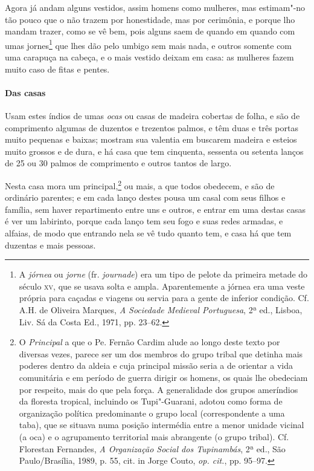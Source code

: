 \begin{linenumbers}
 Agora já andam alguns vestidos, assim homens como mulheres, mas
estimam"-no tão pouco que o não trazem por honestidade, mas por
cerimônia, e porque lho mandam trazer, como se vê bem, pois alguns
saem de quando em quando com umas jornes\footnote{ A \textit{jórnea} 
ou \textit{jorne} (fr. \textit{journade}) era um tipo
de pelote da primeira metade do século \textsc{xv}, que se usava solta e
ampla\textit{.} Aparentemente a jórnea era uma veste própria para
caçadas e viagens ou servia para a gente de inferior condição. Cf.
A.H. de Oliveira Marques, \textit{A Sociedade Medieval Portuguesa}, 2ª
ed., Lisboa, Liv. Sá da Costa Ed., 1971, pp. 23--62.} que lhes dão pelo
umbigo sem mais nada, e outros somente com uma carapuça na cabeça, e o
mais vestido deixam em casa: as mulheres fazem muito caso de fitas e pentes.

\paragraph{Das casas}\quad
Usam estes índios de umas \textit{ocas} ou casas de madeira
cobertas de folha, e são de comprimento algumas de duzentos e trezentos
palmos, e têm duas e três portas muito pequenas e baixas; mostram sua
valentia em buscarem madeira e esteios muito grossos e de dura, e há
casa que tem cinquenta, sessenta ou setenta lanços de 25 ou 30 palmos
de comprimento e outros tantos de largo.
 
 Nesta casa mora um principal,\footnote{ O \textit{Principal} a que o
Pe. Fernão Cardim alude ao longo deste texto por diversas vezes, parece
ser um dos membros do grupo tribal que detinha mais poderes dentro da
aldeia e cuja principal missão seria a de orientar a vida comunitária e
em período de guerra dirigir os homens, os quais lhe obedeciam por
respeito, mais do que pela força. A generalidade dos grupos ameríndios
da floresta tropical, incluindo os Tupi"-Guarani, adotou como forma de
organização política predominante o grupo local (correspondente a uma
taba), que se situava numa posição intermédia entre a menor unidade
vicinal (a oca) e o agrupamento territorial mais abrangente (o grupo
tribal). Cf. Florestan Fernandes, \textit{A Organização Social dos
Tupinambás}, 2ª ed., São Paulo/Brasília, 1989, p. 55, cit. in Jorge
Couto, \textit{op. cit.}, pp. 95--97.} ou mais, a que todos obedecem, e
são de ordinário parentes; e em cada lanço destes pousa um casal com
seus filhos e família, sem haver repartimento entre uns e outros, e
entrar em uma destas casas é ver um labirinto, porque cada lanço tem
seu fogo e suas redes armadas, e alfaias, de modo que entrando nela se
vê tudo quanto tem, e casa há que tem duzentas e mais pessoas.


\end{linenumbers}
